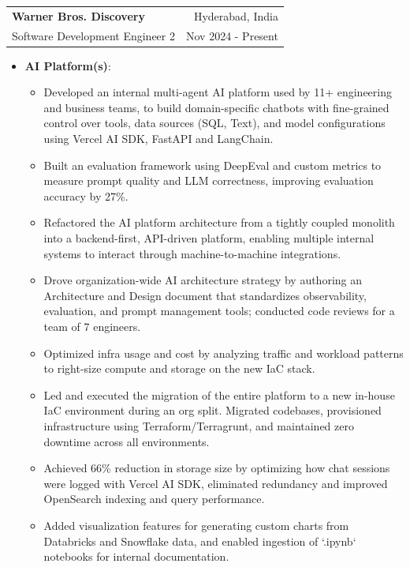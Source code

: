 \documentclass[letterpaper,10pt]{article}
\makeatletter
\newcommand{\resumeItems}[2]{
  \item\small{
    \textbf{#1}{:} 
  \begin{itemize}[label=\textbullet, left=2pt, itemsep=1pt]
      #2
    \end{itemize}
    }
}
\newcommand{\resumeSubheading}[4]{
  \item
    \begin{tabular*}{0.97\textwidth}{l@{\extracolsep{\fill}}r}
      \textbf{#1} & {\small #2} \\
      {\small#3} & {\small #4} \\
    \end{tabular*}\vspace{-4pt}
}
\newcommand{\resumeItemListStart}{\begin{itemize}[left=3pt]}
\newcommand{\resumeItemListEnd}{\end{itemize}\vspace{-5pt}}
\makeatother
\begin{document}
    \resumeSubheading
          {Warner Bros. Discovery}{Hyderabad, India}
          {Software Development Engineer 2}{Nov 2024 - Present}
          \resumeItemListStart
            \resumeItems{AI Platform(s)}
            {
                \item  Developed an internal multi-agent AI platform used by 11+ engineering and business teams, to build domain-specific chatbots with fine-grained control over tools, data sources (SQL, Text), and model configurations using Vercel AI SDK, FastAPI and  LangChain.

                \item Built an evaluation framework using DeepEval and custom metrics to measure prompt quality and LLM correctness, improving evaluation accuracy by 27\%.
                
                \item Refactored the AI platform architecture from a tightly coupled monolith into a backend-first, API-driven platform, enabling multiple internal systems to interact through machine-to-machine integrations.

                \item Drove organization-wide AI architecture strategy by authoring an Architecture and Design document that standardizes observability, evaluation, and prompt management tools; conducted code reviews for a team of 7 engineers.

                \item Optimized infra usage and cost by analyzing traffic and workload patterns to right-size compute and storage on the new IaC stack.
                
                \item Led and executed the migration of the entire platform to a new in-house IaC environment during an org split. Migrated codebases, provisioned infrastructure using Terraform/Terragrunt, and maintained zero downtime across all environments.

                \item Achieved 66\% reduction in storage size by optimizing how chat sessions were logged with Vercel AI SDK, eliminated redundancy and improved OpenSearch indexing and query performance.
                
                \item Added visualization features for generating custom charts from Databricks and Snowflake data, and enabled ingestion of `.ipynb` notebooks for internal documentation.  
            }
        \resumeItemListEnd
        \vspace{3pt}
\end{document}
